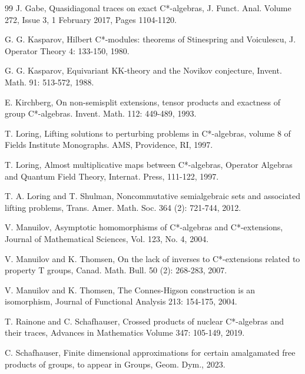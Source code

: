 \documentclass{article}%
\begin{document}
\begin{thebibliography}{99}
J. Gabe, Quasidiagonal traces on exact C*-algebras, J. Funct. Anal.
Volume 272, Issue 3, 1 February 2017, Pages 1104-1120.


G. G. Kasparov, Hilbert C*-modules: theorems of Stinespring and Voiculescu, J. Operator Theory 4: 133-150,  1980.

  G. G.  Kasparov, Equivariant KK-theory and the Novikov conjecture, Invent.
Math. 91: 513-572, 1988.

E. Kirchberg, On non-semisplit extensions, tensor products and exactness of group C*-algebras. Invent. Math. 112: 449-489, 1993.

T. Loring, Lifting solutions to perturbing problems in C*-algebras, volume 8 of Fields
Institute Monographs. AMS, Providence, RI, 1997.


T. Loring, Almost multiplicative maps between C*-algebras, Operator Algebras and Quantum
Field Theory, Internat. Press, 111-122, 1997.

 T. A. Loring and T. Shulman, Noncommutative semialgebraic sets and associated lifting problems, Trans. Amer. Math. Soc. 364 (2): 721-744,  2012.

V. Manuilov, Asymptotic homomorphisms of C*-algebras and C*-extensions, Journal of Mathematical Sciences, Vol. 123, No. 4, 2004.

 V. Manuilov and K. Thomsen, On the lack of inverses to C*-extensions
related to property T groups, Canad. Math. Bull. 50 (2): 268-283, 2007.

V. Manuilov and K. Thomsen, The Connes-Higson construction
is an isomorphism, Journal of Functional Analysis 213: 154-175, 2004.




 T. Rainone and C. Schafhauser, Crossed products of nuclear C*-algebras and their traces, Advances in Mathematics
Volume 347: 105-149,  2019.

C. Schafhauser, Finite dimensional approximations for certain amalgamated free products of groups, to appear in  Groups, Geom. Dym., 2023.




\end{thebibliography}
\end{document}
